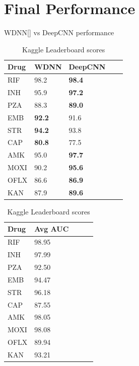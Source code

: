 \documentclass{article}
\begin{document}
\section{Final Performance}
\begin{table}[t]
  \begin{minipage}{0.5\linewidth}
  \centering
  \caption{WDNN[] vs DeepCNN performance}
  \begin{tabular}{lllll}
      \toprule
      \multirow{1}{*}[0em]{Drug} & WDNN & DeepCNN\\
      \midrule
      RIF & 98.2 & \textbf{98.4}\\
      INH & 95.9 & \textbf{97.2} \\
      PZA & 88.3 & \textbf{89.0} \\
      EMB & \textbf{92.2} & 91.6 \\
      STR & \textbf{94.2} & 93.8\\
      CAP & \textbf{80.8} & 77.5 \\
      AMK & 95.0 & \textbf{97.7} \\
      MOXI & 90.2 & \textbf{95.6} \\
      OFLX & 86.6 & \textbf{86.9}\\
      KAN & 87.9 & \textbf{89.6} \\
      \bottomrule
  \end{tabular}
  \label{table:compare_sota}
\end{minipage}
\begin{minipage}{0.5\linewidth}
  \centering
  \caption{Kaggle Leaderboard scores}
  \begin{tabular}{lllll}
      \toprule
      \multirow{1}{*}[0em]{Drug} & Avg AUC\\
      \midrule
      RIF & 98.95 \\
      INH & 97.99 \\
      PZA & 92.50 \\
      EMB & 94.47 \\
      STR & 96.18 \\
      CAP & 87.55 \\
      AMK & 98.05  \\
      MOXI & 98.08  \\
      OFLX & 89.94 \\
      KAN & 93.21  \\
      \bottomrule
  \end{tabular}
  \label{table:kaggle_results}
\end{minipage}
\end{table}
\end{document}

